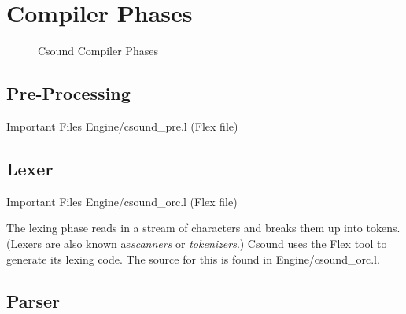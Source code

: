 \documentclass[]{book}
\begin{document}
\section{Compiler Phases}

\begin{figure}[htbp]
\centerline{}
\caption{Csound Compiler Phases}
\label{overview}
\end{figure}

\subsection{Pre-Processing}

\begin{bclogo}[couleur=blue!30,arrondi=0.1,ombre=true,logo=\bcetoile]
{Important Files}
Engine/csound\_pre.l (Flex file)
\end{bclogo}



\subsection{Lexer}

\begin{bclogo}[couleur=blue!30,arrondi=0.1,ombre=true,logo=\bcetoile]
{Important Files}
Engine/csound\_orc.l (Flex file)
\end{bclogo}

The lexing phase reads in a stream of characters and breaks them up into
tokens. (Lexers are also known as\emph{scanners} or \emph{tokenizers}.)
Csound uses the \href{http://flex.sourceforge.net/}{Flex} tool to
generate its lexing code. The source for this is found in
Engine/csound\_orc.l.


\subsection{Parser}
\end{document}

